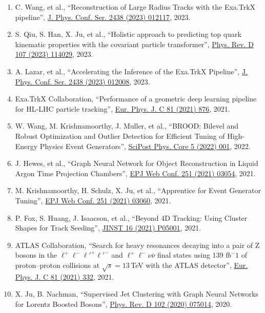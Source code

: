\begin{enumerate}
\item C. Wang, et al., ``Reconstruction of Large Radius Tracks with the Exa.TrkX pipeline'', \href{https://doi.org/10.1088/1742-6596/2438/1/012117}{J. Phys. Conf. Ser. 2438 (2023) 012117}, 2023.
\item S. Qiu, S. Han, X. Ju, et al., ``Holistic approach to predicting top quark kinematic properties with the covariant particle transformer'', \href{https://doi.org/10.1103/PhysRevD.107.114029}{Phys. Rev. D 107 (2023) 114029}, 2023.
\item A. Lazar, et al., ``Accelerating the Inference of the Exa.TrkX Pipeline'', \href{https://doi.org/10.1088/1742-6596/2438/1/012008}{J. Phys. Conf. Ser. 2438 (2023) 012008}, 2023.
\item Exa.TrkX Collaboration, ``Performance of a geometric deep learning pipeline for HL-LHC particle tracking'', \href{https://doi.org/10.1140/epjc/s10052-021-09675-8}{Eur. Phys. J. C 81 (2021) 876}, 2021.
\item W. Wang, M. Krishnamoorthy, J. Muller, et al., ``BROOD: Bilevel and Robust Optimization and Outlier Detection for Efficient Tuning of High-Energy Physics Event Generators'', \href{https://doi.org/10.21468/SciPostPhysCore.5.1.001}{SciPost Phys. Core 5 (2022) 001}, 2022.
\item J. Hewes, et al., ``Graph Neural Network for Object Reconstruction in Liquid Argon Time Projection Chambers'', \href{https://doi.org/10.1051/epjconf/202125103054}{EPJ Web Conf. 251 (2021) 03054}, 2021.
\item M. Krishnamoorthy, H. Schulz, X. Ju, et al., ``Apprentice for Event Generator Tuning'', \href{https://doi.org/10.1051/epjconf/202125103060}{EPJ Web Conf. 251 (2021) 03060}, 2021.
\item P. Fox, S. Huang, J. Isaacson, et al., ``Beyond 4D Tracking: Using Cluster Shapes for Track Seeding'', \href{https://doi.org/10.1088/1748-0221/16/05/P05001}{JINST 16 (2021) P05001}, 2021.
\item ATLAS Collaboration, ``Search for heavy resonances decaying into a pair of Z bosons in the $\ell ^+\ell ^-\ell '^+\ell '^-$ and $\ell ^+\ell ^-\nu \bar\nu $ final states using 139 $\mathrm fb^-1$ of proton–proton collisions at $\sqrt{s} = 13\,$TeV with the ATLAS detector'', \href{https://doi.org/10.1140/epjc/s10052-021-09013-y}{Eur. Phys. J. C 81 (2021) 332}, 2021.
\item X. Ju, B. Nachman, ``Supervised Jet Clustering with Graph Neural Networks for Lorentz Boosted Bosons'', \href{https://doi.org/10.1103/PhysRevD.102.075014}{Phys. Rev. D 102 (2020) 075014}, 2020.

\end{enumerate}
